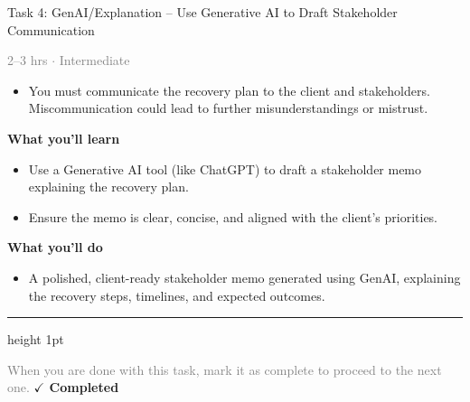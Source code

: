 \documentclass[10pt,a4paper]{article}
\begin{document}
\begin{taskbox}{Task 4: GenAI/Explanation – Use Generative AI to Draft Stakeholder Communication}

    {\small \textcolor{gray}{2--3 hrs $\cdot$ Intermediate}}\\[12pt]

\begin{itemize}
    \item You must communicate the recovery plan to the client and stakeholders. Miscommunication could lead to further misunderstandings or mistrust.

\end{itemize}
\vspace{8pt}
{\large \textbf{\textcolor{brandLight}{What you'll learn}}}\\[4pt] 
\begin{itemize}
    \item Use a Generative AI tool (like ChatGPT) to draft a stakeholder memo explaining the recovery plan.
    \item Ensure the memo is clear, concise, and aligned with the client’s priorities.

\end{itemize}
{\large \textbf{\textcolor{brandLight}{What you'll do}}}\\[4pt] 
\begin{itemize}
    \item A polished, client-ready stakeholder memo generated using GenAI, explaining the recovery steps, timelines, and expected outcomes.\par
\end{itemize}

    \vspace{16pt}

    \textcolor{cardBorder}{\hrule height 1pt}\vspace{8pt}

    \small \textcolor{gray}{When you are done with this task, mark it as complete to proceed to the next one.} \hfill \textbf{\textcolor{brandDark}{$\checkmark$ Completed}}

\end{taskbox}
\end{document}
